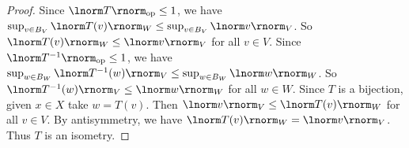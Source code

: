 \documentclass[11pt,twoside,openany]{memoir}
\begin{document}
    \begin{exercise}
        
    \end{exercise}
        {\color{red} \begin{proof}
            Since $\lnorm T \rnorm_\text{op} \leq 1$, we have $\sup_{v \in B_V} \lnorm T(v) \rnorm_W \leq \sup_{v \in B_V}\lnorm v \rnorm_V$. So $\lnorm T(v) \rnorm_W \leq \lnorm v \rnorm_V$ for all $v \in V$. Since $\lnorm T^{-1} \rnorm_\text{op} \leq 1$, we have $\sup_{w \in B_W} \lnorm T^{-1}(w) \rnorm_V \leq \sup_{w \in B_W}\lnorm w \rnorm_W$. So $\lnorm T^{-1}(w) \rnorm_V \leq \lnorm w \rnorm_W$ for all $w \in W$. Since $T$ is a bijection, given $x \in X$ take $w = T(v)$. Then $\lnorm v \rnorm_V \leq \lnorm T(v) \rnorm_W$ for all $v \in V$. By antisymmetry, we have $\lnorm T(v) \rnorm_W = \lnorm v \rnorm_V$. Thus $T$ is an isometry.
        \end{proof}}
\end{document}
